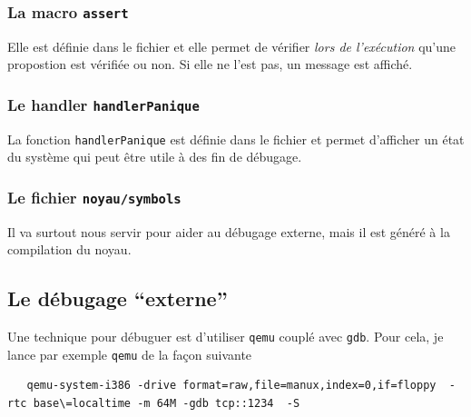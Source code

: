 %
\subsubsection{La macro {\tt assert}}

   Elle est définie dans le fichier 
et elle permet de vérifier {\em lors de l'exécution} qu'une propostion
est vérifiée ou non. Si elle ne l'est pas, un message est affiché.

%
\subsubsection{Le handler {\tt handlerPanique}}

   La fonction {\tt handlerPanique} est définie dans le fichier
 et permet d'afficher un état du
système qui peut être utile à des fin de débugage.

%
\subsubsection{Le fichier {\tt noyau/symbols}}

   Il va surtout nous servir pour aider au débugage externe, mais il
est généré à la compilation du noyau.
 
%
\subsection{Le débugage ``externe''}
\label{subsection:debugage_externe}

   Une technique pour débuguer est d'utiliser {\tt qemu} couplé avec
{\tt gdb}. Pour cela, je lance par exemple {\tt qemu} de la façon suivante

\begin{lstlisting}
   qemu-system-i386 -drive format=raw,file=manux,index=0,if=floppy  -rtc base\=localtime -m 64M -gdb tcp::1234  -S 
\end{lstlisting}

